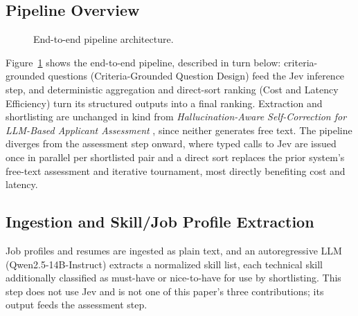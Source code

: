 \documentclass[journal]{IEEEtran}
\begin{document}
\subsection{Pipeline Overview}
\begin{figure}[H]
\centering
{}
\caption{End-to-end pipeline architecture.}
\label{fig_pipeline}
\end{figure}
Figure~\ref{fig_pipeline} shows the end-to-end pipeline, described in turn below: criteria-grounded questions (Criteria-Grounded Question Design) feed the Jev inference step, and deterministic aggregation and direct-sort ranking (Cost and Latency Efficiency) turn its structured outputs into a final ranking. Extraction and shortlisting are unchanged in kind from \emph{Hallucination-Aware Self-Correction for LLM-Based Applicant Assessment} \cite{ref2}, since neither generates free text. The pipeline diverges from the assessment step onward, where typed calls to Jev are issued once in parallel per shortlisted pair and a direct sort replaces the prior system's free-text assessment and iterative tournament, most directly benefiting cost and latency.

\subsection{Ingestion and Skill/Job Profile Extraction}
Job profiles and resumes are ingested as plain text, and an autoregressive LLM (Qwen2.5-14B-Instruct) extracts a normalized skill list, each technical skill additionally classified as must-have or nice-to-have for use by shortlisting. This step does not use Jev and is not one of this paper's three contributions; its output feeds the assessment step.
\end{document}
